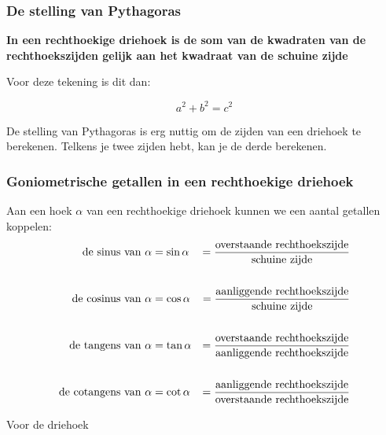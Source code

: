 \newpage

\subsubsection{De stelling van Pythagoras}

\begin{center}\textbf{In een rechthoekige driehoek is de 
		som van de kwadraten van de rechthoekszijden gelijk aan het kwadraat van de schuine zijde}\end{center}



Voor deze tekening is dit dan:

\[a^2+b^2=c^2\]

De stelling van Pythagoras is erg nuttig om de zijden van een driehoek te berekenen. Telkens je twee zijden hebt, kan je de derde berekenen.

\subsubsection{Goniometrische getallen in een rechthoekige driehoek}

Aan een hoek $\alpha$ van een rechthoekige driehoek kunnen we een aantal getallen koppelen:
\begin{align*}
\textup{de sinus van }\alpha &=\sin \alpha &= \frac{\textup{overstaande rechthoekszijde}}{\textup{schuine zijde}}\\
&&\\
\textup{de cosinus van }\alpha &=\cos \alpha &= \frac{\textup{aanliggende rechthoekszijde}}{\textup{schuine zijde}}\\
&&\\
\textup{de tangens van }\alpha &=\tan \alpha &= \frac{\textup{overstaande rechthoekszijde}}{\textup{aanliggende rechthoekszijde}}\\
&&\\
\textup{de cotangens van }\alpha &=\cot \alpha &= \frac{\textup{aanliggende rechthoekszijde}}{\textup{overstaande rechthoekszijde}}
\end{align*}

Voor de driehoek

